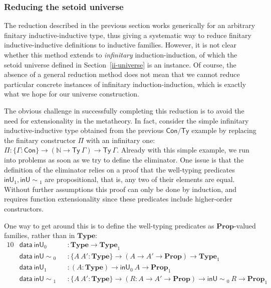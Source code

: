 \documentclass[autoref]{llncs}
\newcommand{\GG}{\Gamma}
\newcommand{\inU}{\mathsf{inU}}
\newcommand{\inUU}{\mathsf{inU{\sim}}}
\newcommand{\mType}{\mathbf{Type}}
\newcommand{\mProp}{\mathbf{Prop}}
\begin{document}
\subsubsection{Reducing the setoid universe}\label{inductive-universe}

The reduction described in the previous section works generically for an
arbitrary finitary inductive-inductive type, thus giving a systematic way to
reduce finitary inductive-inductive definitions to inductive families. However,
it is not clear whether this method extends to \emph{infinitary}
induction-induction, of which the setoid universe defined in
Section~\ref{ii-universe} is an instance.
%
Of course, the absence of a general reduction method does not mean that we cannot
reduce particular concrete instances of infinitary induction-induction, which is
exactly what we hope for our universe construction.

The obvious challenge in successfully completing this reduction is to avoid the
need for extensionality in the metatheory. In fact, consider the simple
infinitary inductive-inductive type obtained from the previous $\textsf{Con/Ty}$
example by replacing the finitary constructor $\Pi$ with an infinitary one: $\Pi
: \{\GG : \textsf{Con}\} \to (\mathds{N} \to \textsf{Ty}\ \GG) \to
\textsf{Ty}\ \GG$. Already with this simple example, we run into problems as
soon as we try to define the eliminator. One issue is that the definition of the
eliminator relies on a proof that the well-typing predicates $\inU_1,
\inUU_1$ are propositional, that is, any two of their elements are equal.
%
Without further assumptions this proof can only be done by induction, and
requires function extensionality since these predicates include higher-order
constructors.

One way to get around this is to define the well-typing predicates as
$\mProp$-valued families, rather than in $\mType$:
{\small\vspace{-0.2em}
\begin{alignat*}{10}
  & \textsf{data}\ \inU_0 && : \mType \to \mType_1 \\
  & \textsf{data}\ \inUU_0 && : \{A\ A' : \mType\} \to (A \to A' \to \mProp) \to \mType_1 \\
  & \textsf{data}\ \inU_1 && : (A : \mType) \to \inU_0\ A \to \mProp_1 \\
  & \textsf{data}\ \inUU_1 && : \{A\ A' : \mType\} \to (R : A \to A' \to \mProp) \to \inUU_0\ R \to \mProp_1
\end{alignat*}}\vspace{-1em}
\end{document}

